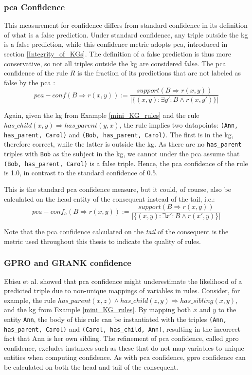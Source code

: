 \subsubsection{\gls{pca} Confidence}
This measurement for confidence differs from standard confidence in its definition of what is a false prediction. Under standard confidence, any triple outside the \gls{kg} is a false prediction, while this confidence metric adopts \gls{pca}, introduced in section \ref{Integrity_of_KGs}. The definition of a false prediction is thus more conservative, so not all triples outside the \gls{kg} are considered false. The \gls{pca} confidence of the rule $R$ is the fraction of its predictions that are not labeled as false by the \gls{pca} \cite{amie}:
\[pca-conf(B\Rightarrow r(x, y)) := \frac{support(B\Rightarrow r(x, y))}{|\{(x, y):\exists y' : B \wedge r(x, y')\}|}\]

Again, given the \gls{kg} from Example \ref{mini_KG_rules} and the rule $has\_child(x, y) \Rightarrow has\_parent(y, x)$, the rule implies two datapoints: \texttt{(Ann, has\_parent, Carol)} and \texttt{(Bob, has\_parent, Carol)}. The first is in the \gls{kg}, therefore correct, while the latter is outside the \gls{kg}. As there are no \texttt{has\_parent} triples with \texttt{Bob} as the subject in the \gls{kg}, we cannot under the \gls{pca} assume that \texttt{(Bob, has\_parent, Carol)} is a false triple. Hence, the \gls{pca} confidence of the rule is 1.0, in contrast to the standard confidence of 0.5.

This is the standard \gls{pca} confidence measure, but it could, of course, also be calculated on the head entity of the consequent instead of the tail, i.e.: 
\[pca-conf_h(B\Rightarrow r(x, y)) := \frac{support(B\Rightarrow r(x, y))}{|\{(x, y):\exists x' : B \wedge r(x', y)\}|}\]

Note that the \gls{pca} confidence calculated on the \textit{tail} of the consequent is the metric used throughout this thesis to indicate the quality of rules.

\subsubsection{GPRO and GRANK confidence}
Ebisu et al. \cite{gpro} showed that \gls{pca} confidence might underestimate the likelihood of a predicted triple due to non-unique mappings of variables in rules. Consider, for example, the rule $has\_parent(x, z) \wedge has\_child(z, y) \Rightarrow has\_sibling(x, y)$, and the \gls{kg} from Example \ref{mini_KG_rules}. By mapping both $x$ and $y$ to the entity \texttt{Ann}, the body of this rule can be instantiated with the triples \texttt{(Ann, has\_parent, Carol)} and \texttt{(Carol, has\_child, Ann)}, resulting in the incorrect fact that Ann is her own sibling. The refinement of \gls{pca} confidence, called \gls{gpro} confidence, excludes instances such as these that do not map variables to unique entities when computing confidence. As with \gls{pca} confidence, \gls{gpro} confidence can be calculated on both the head and tail of the consequent.

